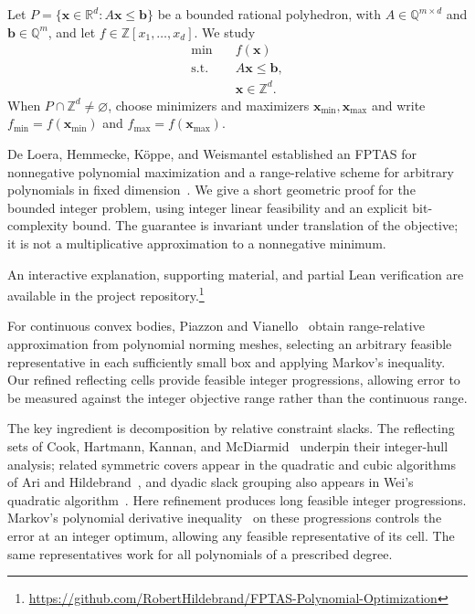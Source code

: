 \documentclass[final,5p,times,twocolumn]{elsarticle}
\theoremstyle{definition}\newtheorem{definition}{Definition}[section]
\theoremstyle{remark}\newtheorem{remark}[theorem]{Remark}
\newcommand{\R}{\mathbb R}\newcommand{\Q}{\mathbb Q}\newcommand{\Z}{\mathbb Z}
\begin{document}
Let $P=\{\mathbf{x}\in\R^d:A\mathbf{x}\le\mathbf b\}$ be a bounded rational polyhedron, with $A\in\Q^{m\times d}$ and $\mathbf b\in\Q^m$, and let $f\in\Z[x_1,\ldots,x_d]$. We study
\begin{equation}\label{eq:problem}
 \begin{aligned}
 \min\quad & f(\mathbf{x})\\
 \text{s.t.}\quad & A\mathbf{x}\le\mathbf b,\\
 & \mathbf{x}\in\Z^d.
 \end{aligned}
\end{equation}
When $P\cap\Z^d\ne\varnothing$, choose minimizers and maximizers $\mathbf{x}_{\min},\mathbf{x}_{\max}$ and write $f_{\min}=f(\mathbf{x}_{\min})$ and $f_{\max}=f(\mathbf{x}_{\max})$.

De Loera, Hemmecke, K\"oppe, and Weismantel established an FPTAS for nonnegative polynomial maximization and a range-relative scheme for arbitrary polynomials in fixed dimension~\cite{DHKW06,DHKW08}. We give a short geometric proof for the bounded integer problem, using integer linear feasibility and an explicit bit-complexity bound. The guarantee is invariant under translation of the objective; it is not a multiplicative approximation to a nonnegative minimum.

An interactive explanation, supporting material, and partial Lean verification are available in the project repository.\footnote{\url{https://github.com/RobertHildebrand/FPTAS-Polynomial-Optimization}}

For continuous convex bodies, Piazzon and Vianello~\cite[Propositions~1--2]{PV} obtain range-relative approximation from polynomial norming meshes, selecting an arbitrary feasible representative in each sufficiently small box and applying Markov's inequality. Our refined reflecting cells provide feasible integer progressions, allowing error to be measured against the integer objective range rather than the continuous range.

The key ingredient is decomposition by relative constraint slacks. The reflecting sets of Cook, Hartmann, Kannan, and McDiarmid~\cite{CHKM} underpin their integer-hull analysis; related symmetric covers appear in the quadratic and cubic algorithms of Ari and Hildebrand~\cite{AH}, and dyadic slack grouping also appears in Wei's quadratic algorithm~\cite[Section~4.1]{Wei}. Here refinement produces long feasible integer progressions. Markov's polynomial derivative inequality~\cite[Theorem~5.1.8]{BorweinErdelyi} on these progressions controls the error at an integer optimum, allowing any feasible representative of its cell. The same representatives work for all polynomials of a prescribed degree.
\end{document}

